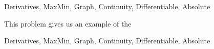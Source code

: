 \begin{tagblock}{Derivatives, MaxMin, Graph, Continuity, Differentiable, Absolute}
\begin{question}
\begin{enumerate}
\begin{minipage}{.6\textwidth}
\begin{enumerate}
\end{enumerate}

\end{minipage}

\end{enumerate}

\vfill

This problem gives us an example of the \\

\bigskip
\noindent{}






	
\begin{tags}
	   Derivatives, MaxMin, Graph, Continuity, Differentiable, Absolute
\end{tags}
	
\begin{diary}
\end{diary}
	
\begin{solution}
	   
\end{solution}
	
\end{question}

\end{tagblock}



